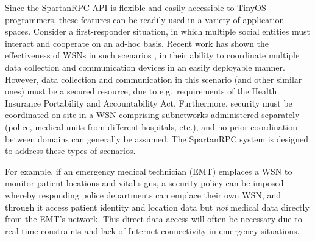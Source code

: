 Since the SpartanRPC API is flexible and easily accessible to TinyOS
programmers, these features can be readily used in a variety of
application spaces. Consider a first-responder situation, in which
multiple social entities must interact and cooperate on an ad-hoc basis.
Recent work has shown the effectiveness of WSNs in such scenarios
\cite{citeulike:4460555,1038146}, in their ability to coordinate
multiple data collection and communication devices in an easily
deployable manner. However, data collection and communication in this
scenario (and other similar ones) must be a secured resource, due to
e.g.~requirements of the Health Insurance Portability and Accountability
Act. Furthermore, security must be coordinated on-site in a WSN
comprising subnetworks administered separately (police, medical units
from different hospitals, etc.), and no prior coordination between
domains can generally be assumed. The SpartanRPC system is designed to
address these types of scenarios.


For example, if an emergency medical technician (EMT) emplaces a WSN to
monitor patient locations and vital signs, a security policy can be
imposed whereby responding police departments can emplace their own WSN,
and through it access patient identity and location data but \emph{not}
medical data directly from the EMT's network. This direct data access
will often be necessary due to real-time constraints and lack of
Internet connectivity in emergency situations.

